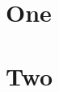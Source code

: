 \documentclass[a4paper,twoside]{book}
\begin{document}
     


\chapter{One}


\chapter{Two}



\end{document}
